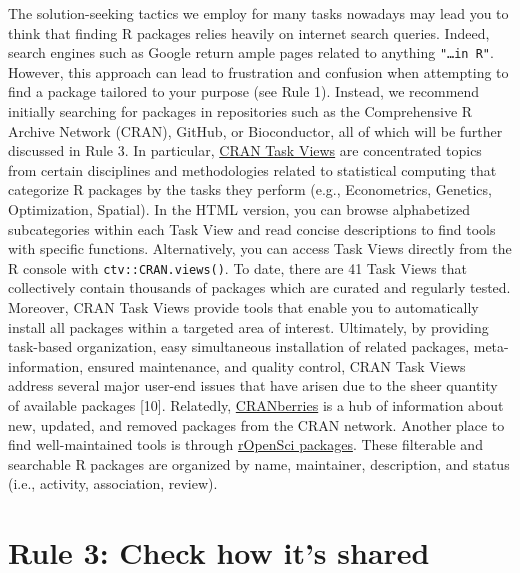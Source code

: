\documentclass[10pt,letterpaper]{article}
\begin{document}
The solution-seeking tactics we employ for many tasks nowadays may lead
you to think that finding R packages relies heavily on internet search
queries. Indeed, search engines such as Google return ample pages
related to anything \texttt{"\ldots{}in\ R"}. However, this approach can
lead to frustration and confusion when attempting to find a package
tailored to your purpose (see Rule 1). Instead, we recommend initially
searching for packages in repositories such as the Comprehensive R
Archive Network (CRAN), GitHub, or Bioconductor, all of which will be
further discussed in Rule 3. In particular,
\href{https://cran.r-project.org/web/views/}{CRAN Task Views} are
concentrated topics from certain disciplines and methodologies related
to statistical computing that categorize R packages by the tasks they
perform (e.g., Econometrics, Genetics, Optimization, Spatial). In the
HTML version, you can browse alphabetized subcategories within each Task
View and read concise descriptions to find tools with specific
functions. Alternatively, you can access Task Views directly from the R
console with \texttt{ctv::CRAN.views()}. To date, there are 41 Task
Views that collectively contain thousands of packages which are curated
and regularly tested. Moreover, CRAN Task Views provide tools that
enable you to automatically install all packages within a targeted area
of interest. Ultimately, by providing task-based organization, easy
simultaneous installation of related packages, meta-information, ensured
maintenance, and quality control, CRAN Task Views address several major
user-end issues that have arisen due to the sheer quantity of available
packages {[}10{]}. Relatedly,
\href{http://dirk.eddelbuettel.com/cranberries/index.html}{CRANberries}
is a hub of information about new, updated, and removed packages from
the CRAN network. Another place to find well-maintained tools is through
\href{https://ropensci.org/packages/}{rOpenSci packages}. These
filterable and searchable R packages are organized by name, maintainer,
description, and status (i.e., activity, association, review).

\hypertarget{rule-3-check-how-its-shared}{%
\section{Rule 3: Check how it's
shared}\label{rule-3-check-how-its-shared}}
\end{document}
